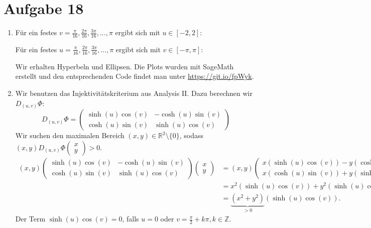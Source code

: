 \documentclass[a4paper]{article}
\theoremstyle{plain}
\begin{document}
\section*{Aufgabe 18}
\begin{enumerate}[label=(\roman*)]
	\item Für ein festes $v = \frac{\pi}{16}, \frac{2\pi}{16}, \frac{3\pi}{16},...,\pi $ ergibt sich mit $u \in [-2,2]$:
	\begin{center}
	\end{center}
	Für ein festes $u =  \frac{\pi}{16}, \frac{2\pi}{16}, \frac{3\pi}{16},...,\pi $ ergibt sich mit $v \in [-\pi,\pi]$:
	\begin{center}
	\end{center}
	Wir erhalten Hyperbeln und Ellipsen. Die Plots wurden mit SageMath erstellt und den entsprechenden Code findet man unter \href{https://git.io/fpWyk}{https://git.io/fpWyk}.  
	
	\item Wir benutzen das Injektivitätskriterium aus Analysis II. Dazu berechnen wir $D_{(u,v)}\Phi$:
	\[
		D_{(u,v)}\Phi = \begin{pmatrix}
			\sinh(u) \cos(v) &  -\cosh(u)\sin(v) \\
			\cosh(u) \sin(v) & \sinh(u) \cos(v)
		\end{pmatrix}
	\]
	Wir suchen den maximalen Bereich $(x,y) \in \mathbb R^2 \setminus \{ 0 \}$, sodass $(x,y)D_{(u,v)}\Phi \begin{pmatrix}x \\ y \end{pmatrix} > 0$.
	\begin{align*}
			(x,y)\begin{pmatrix}
				\sinh(u) \cos(v) &  -\cosh(u)\sin(v) \\
				\cosh(u) \sin(v) & \sinh(u) \cos(v)
			\end{pmatrix} \begin{pmatrix}x \\ y \end{pmatrix} &=
			(x,y) \begin{pmatrix}
				x(\sinh(u)\cos(v)) -y(\cosh(u) \sin(v)) \\
				x(\cosh(u)\sin(v))+y(\sinh(u)\cos(v))
			\end{pmatrix}\\
			&= x^2(\sinh(u)\cos(v)) + y^2(\sinh(u)\cos(v)) \\
			&= \underbrace{(x^2+y^2)}_{> 0}(\sinh(u)\cos(v)).
	\end{align*}
	Der Term $\sinh(u)\cos(v) = 0$, falls $u = 0$ oder $v = \frac{\pi}{2} + k\pi, k \in \mathbb Z$. 
	

\end{enumerate}
\end{document}
